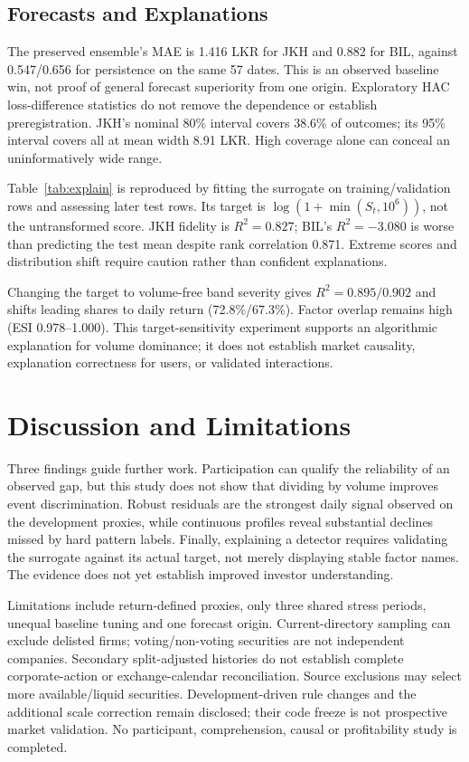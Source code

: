 \documentclass[conference]{IEEEtran}
\begin{document}
\subsection{Forecasts and Explanations}
The preserved ensemble's MAE is 1.416 LKR for JKH and 0.882 for BIL, against 0.547/0.656 for persistence on the same 57 dates. This is an observed baseline win, not proof of general forecast superiority from one origin. Exploratory HAC loss-difference statistics do not remove the dependence or establish preregistration. JKH's nominal 80\% interval covers 38.6\% of outcomes; its 95\% interval covers all at mean width 8.91 LKR. High coverage alone can conceal an uninformatively wide range.



Table~\ref{tab:explain} is reproduced by fitting the surrogate on training/validation rows and assessing later test rows. Its target is $\log(1+\min(S_t,10^6))$, not the untransformed score. JKH fidelity is $R^2=0.827$; BIL's $R^2=-3.080$ is worse than predicting the test mean despite rank correlation 0.871. Extreme scores and distribution shift require caution rather than confident explanations.

Changing the target to volume-free band severity gives $R^2=0.895/0.902$ and shifts leading shares to daily return (72.8\%/67.3\%). Factor overlap remains high (ESI 0.978--1.000). This target-sensitivity experiment supports an algorithmic explanation for volume dominance; it does not establish market causality, explanation correctness for users, or validated interactions.

\section{Discussion and Limitations}
Three findings guide further work. Participation can qualify the reliability of an observed gap, but this study does not show that dividing by volume improves event discrimination. Robust residuals are the strongest daily signal observed on the development proxies, while continuous profiles reveal substantial declines missed by hard pattern labels. Finally, explaining a detector requires validating the surrogate against its actual target, not merely displaying stable factor names. The evidence does not yet establish improved investor understanding.

Limitations include return-defined proxies, only three shared stress periods, unequal baseline tuning and one forecast origin. Current-directory sampling can exclude delisted firms; voting/non-voting securities are not independent companies. Secondary split-adjusted histories do not establish complete corporate-action or exchange-calendar reconciliation. Source exclusions may select more available/liquid securities. Development-driven rule changes and the additional scale correction remain disclosed; their code freeze is not prospective market validation. No participant, comprehension, causal or profitability study is completed.
\end{document}
